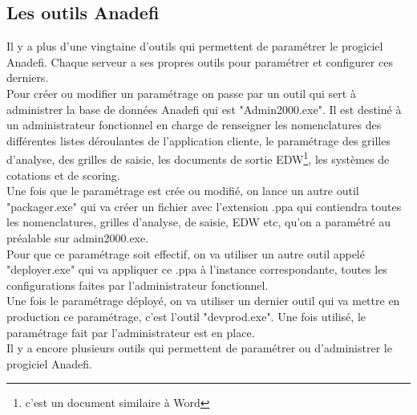 \subsection{Les outils Anadefi}

Il y a plus d'une vingtaine d'outils qui permettent de paramétrer le progiciel Anadefi.
Chaque serveur a ses propres outils pour paramétrer et configurer ces derniers.\\

Pour créer ou modifier un paramétrage on passe par un outil qui sert à administrer la base de données Anadefi qui est "Admin2000.exe". Il est destiné à un administrateur fonctionnel en charge de renseigner les nomenclatures des différentes listes déroulantes de l’application cliente, le paramétrage des grilles d'analyse, des grilles de saisie, les documents de sortie EDW\footnote{c'est un document similaire à Word}, les systèmes de cotations et de scoring.\\

Une fois que le paramétrage est crée ou modifié, on lance un autre outil "packager.exe" qui va créer un fichier avec l'extension .ppa qui contiendra toutes les nomenclatures, grilles d'analyse, de saisie, EDW etc, qu'on a paramétré au préalable sur admin2000.exe.\\

Pour que ce paramétrage soit effectif, on va utiliser un autre outil appelé "deployer.exe" qui va appliquer ce .ppa à l'instance correspondante, toutes les configurations faites par l'administrateur fonctionnel.\\

Une fois le paramétrage déployé, on va utiliser un dernier outil qui va mettre en production ce paramétrage, c'est l'outil "devprod.exe". Une fois utilisé, le paramétrage fait par l'administrateur est en place.\\

Il y a encore plusieurs outils qui permettent de paramétrer ou d'administrer le progiciel Anadefi.


